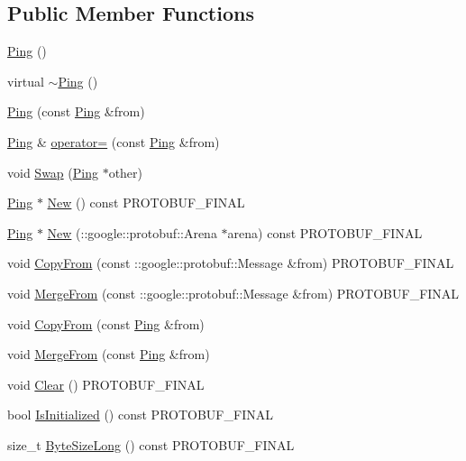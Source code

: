 \subsection*{Public Member Functions}
\begin{DoxyCompactItemize}
\item 
\hyperlink{class_ping_af5927f79e7c2503e999e7a5b936ebc0e}{Ping} ()
\item 
virtual \hyperlink{class_ping_a3e621888861ea796d21647f7d631d388}{$\sim$\+Ping} ()
\item 
\hyperlink{class_ping_a5499ba0022721fe0d37fd8e48ed3831d}{Ping} (const \hyperlink{class_ping}{Ping} \&from)
\item 
\hyperlink{class_ping}{Ping} \& \hyperlink{class_ping_afb745dcad14dc5a11b5d7c24447e429f}{operator=} (const \hyperlink{class_ping}{Ping} \&from)
\item 
void \hyperlink{class_ping_a172fb40e135590891f8bdd967c8b04d3}{Swap} (\hyperlink{class_ping}{Ping} $\ast$other)
\item 
\hyperlink{class_ping}{Ping} $\ast$ \hyperlink{class_ping_a9503d646fc04a0b492ded474f2962c4c}{New} () const P\+R\+O\+T\+O\+B\+U\+F\+\_\+\+F\+I\+N\+AL
\item 
\hyperlink{class_ping}{Ping} $\ast$ \hyperlink{class_ping_ab68530014f62d78280ecc9760882e610}{New} (\+::google\+::protobuf\+::\+Arena $\ast$arena) const P\+R\+O\+T\+O\+B\+U\+F\+\_\+\+F\+I\+N\+AL
\item 
void \hyperlink{class_ping_a5d0432fd8f5344bcfd735315bde6b561}{Copy\+From} (const \+::google\+::protobuf\+::\+Message \&from) P\+R\+O\+T\+O\+B\+U\+F\+\_\+\+F\+I\+N\+AL
\item 
void \hyperlink{class_ping_aff4e93eb934fe0297dfa9c1ddab1b9ae}{Merge\+From} (const \+::google\+::protobuf\+::\+Message \&from) P\+R\+O\+T\+O\+B\+U\+F\+\_\+\+F\+I\+N\+AL
\item 
void \hyperlink{class_ping_aa1dd83aab4419a5f67443f72ee4ffce0}{Copy\+From} (const \hyperlink{class_ping}{Ping} \&from)
\item 
void \hyperlink{class_ping_aaa95c9bed6bcbea48fad8b360bf9ad07}{Merge\+From} (const \hyperlink{class_ping}{Ping} \&from)
\item 
void \hyperlink{class_ping_a5ac6f348fbb846887fa7fbab999a29d0}{Clear} () P\+R\+O\+T\+O\+B\+U\+F\+\_\+\+F\+I\+N\+AL
\item 
bool \hyperlink{class_ping_afb3aeef1183ac24a1cf9cb9415f89bcd}{Is\+Initialized} () const P\+R\+O\+T\+O\+B\+U\+F\+\_\+\+F\+I\+N\+AL
\item 
size\+\_\+t \hyperlink{class_ping_aeed77c8be5aa982bcaa8eb4387bf0e41}{Byte\+Size\+Long} () const P\+R\+O\+T\+O\+B\+U\+F\+\_\+\+F\+I\+N\+AL

\end{DoxyCompactItemize}
